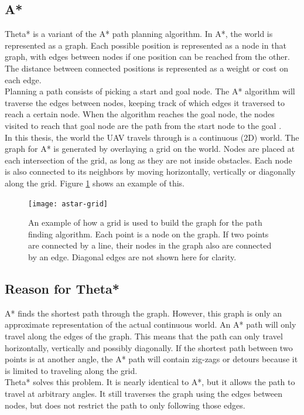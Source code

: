 \subsection{A*}
Theta* is a variant of the A* path planning algorithm. In A*, the world is represented as a graph. Each possible position is represented as a node in that graph, with edges between nodes if one position can be reached from the other. The distance between connected positions is represented as a weight or cost on each edge. \\
Planning a path consists of picking a start and goal node. The A* algorithm will traverse the edges between nodes, keeping track of which edges it traversed to reach a certain node. When the algorithm reaches the goal node, the nodes visited to reach that goal node are the path from the start node to the goal . \\
In this thesis, the world the UAV travels through is a continuous (2D) world. The graph for A* is generated by overlaying a grid on the world. Nodes are placed at each intersection of the grid, as long as they are not inside obstacles. Each node is also connected to its neighbors by moving horizontally, vertically or diagonally along the grid. Figure \ref{fig:astar-grid} shows an example of this.
\begin{figure}
\centering
\texttt{[image: astar-grid]}
\caption[The grid used to build the graph for the Theta* algorithm]{An example of how a grid is used to build the graph for the path finding algorithm. Each point is a node on the graph. If two points are connected by a line, their nodes in the graph also are connected by an edge. Diagonal edges are not shown here for clarity.}
\label{fig:astar-grid}
\end{figure}

\subsection{Reason for Theta*}
A* finds the shortest path through the graph. However, this graph is only an approximate representation of the actual continuous world. An A* path will only travel along the edges of the graph. This means that the path can only travel horizontally, vertically and possibly diagonally. If the shortest path between two points is at another angle, the A* path will contain zig-zags or detours because it is limited to traveling along the grid. \\
Theta* solves this problem. It is nearly identical to A*, but it allows the path to travel at arbitrary angles. It still traverses the graph using the edges between nodes, but does not restrict the path to only following those edges.

